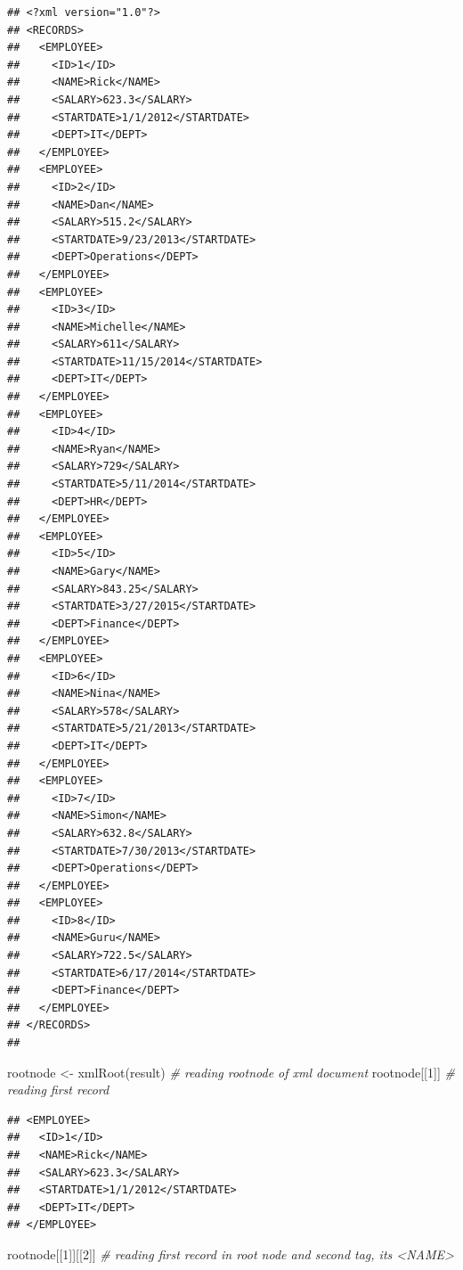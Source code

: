 \documentclass[
]{book}
\newenvironment{Shaded}{\begin{snugshade}}{\end{snugshade}}
\newcommand{\CommentTok}[1]{\textcolor[rgb]{0.56,0.35,0.01}{\textit{#1}}}
\newcommand{\DecValTok}[1]{\textcolor[rgb]{0.00,0.00,0.81}{#1}}
\newcommand{\FunctionTok}[1]{\textcolor[rgb]{0.00,0.00,0.00}{#1}}
\newcommand{\NormalTok}[1]{#1}
\newcommand{\OtherTok}[1]{\textcolor[rgb]{0.56,0.35,0.01}{#1}}
\begin{document}
\begin{verbatim}
## <?xml version="1.0"?>
## <RECORDS>
##   <EMPLOYEE>
##     <ID>1</ID>
##     <NAME>Rick</NAME>
##     <SALARY>623.3</SALARY>
##     <STARTDATE>1/1/2012</STARTDATE>
##     <DEPT>IT</DEPT>
##   </EMPLOYEE>
##   <EMPLOYEE>
##     <ID>2</ID>
##     <NAME>Dan</NAME>
##     <SALARY>515.2</SALARY>
##     <STARTDATE>9/23/2013</STARTDATE>
##     <DEPT>Operations</DEPT>
##   </EMPLOYEE>
##   <EMPLOYEE>
##     <ID>3</ID>
##     <NAME>Michelle</NAME>
##     <SALARY>611</SALARY>
##     <STARTDATE>11/15/2014</STARTDATE>
##     <DEPT>IT</DEPT>
##   </EMPLOYEE>
##   <EMPLOYEE>
##     <ID>4</ID>
##     <NAME>Ryan</NAME>
##     <SALARY>729</SALARY>
##     <STARTDATE>5/11/2014</STARTDATE>
##     <DEPT>HR</DEPT>
##   </EMPLOYEE>
##   <EMPLOYEE>
##     <ID>5</ID>
##     <NAME>Gary</NAME>
##     <SALARY>843.25</SALARY>
##     <STARTDATE>3/27/2015</STARTDATE>
##     <DEPT>Finance</DEPT>
##   </EMPLOYEE>
##   <EMPLOYEE>
##     <ID>6</ID>
##     <NAME>Nina</NAME>
##     <SALARY>578</SALARY>
##     <STARTDATE>5/21/2013</STARTDATE>
##     <DEPT>IT</DEPT>
##   </EMPLOYEE>
##   <EMPLOYEE>
##     <ID>7</ID>
##     <NAME>Simon</NAME>
##     <SALARY>632.8</SALARY>
##     <STARTDATE>7/30/2013</STARTDATE>
##     <DEPT>Operations</DEPT>
##   </EMPLOYEE>
##   <EMPLOYEE>
##     <ID>8</ID>
##     <NAME>Guru</NAME>
##     <SALARY>722.5</SALARY>
##     <STARTDATE>6/17/2014</STARTDATE>
##     <DEPT>Finance</DEPT>
##   </EMPLOYEE>
## </RECORDS>
## 
\end{verbatim}

\begin{Shaded}
\begin{Highlighting}[]
\NormalTok{rootnode }\OtherTok{\textless{}{-}} \FunctionTok{xmlRoot}\NormalTok{(result) }\CommentTok{\# reading rootnode of xml document}
\NormalTok{rootnode[[}\DecValTok{1}\NormalTok{]] }\CommentTok{\# reading first record}
\end{Highlighting}
\end{Shaded}

\begin{verbatim}
## <EMPLOYEE>
##   <ID>1</ID>
##   <NAME>Rick</NAME>
##   <SALARY>623.3</SALARY>
##   <STARTDATE>1/1/2012</STARTDATE>
##   <DEPT>IT</DEPT>
## </EMPLOYEE>
\end{verbatim}

\begin{Shaded}
\begin{Highlighting}[]
\NormalTok{rootnode[[}\DecValTok{1}\NormalTok{]][[}\DecValTok{2}\NormalTok{]] }\CommentTok{\# reading first record in root node and second tag, its \textless{}NAME\textgreater{}}
\end{Highlighting}
\end{Shaded}
\end{document}
